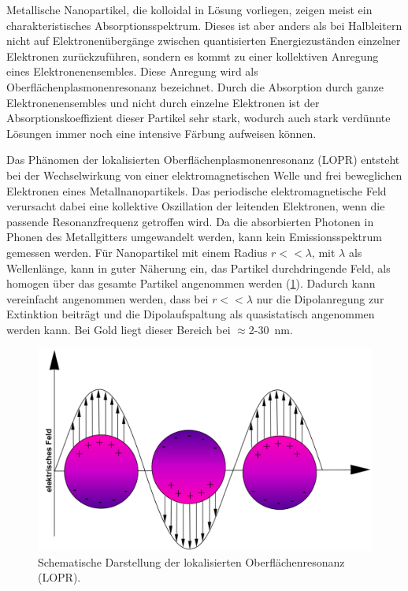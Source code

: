     Metallische Nanopartikel, die kolloidal in Lösung vorliegen, zeigen meist ein charakteristisches Absorptionsspektrum.
    Dieses ist aber anders als bei Halbleitern nicht auf Elektronenübergänge zwischen quantisierten Energiezuständen einzelner Elektronen zurückzuführen, sondern es kommt zu einer kollektiven Anregung eines Elektronenensembles.
    Diese Anregung wird als Oberflächenplasmonenresonanz bezeichnet. \autocite{Mulvaney1996}
    Durch die Absorption durch ganze Elektronenensembles und nicht durch einzelne Elektronen ist der Absorptionskoeffizient dieser Partikel sehr stark, wodurch auch stark verdünnte Lösungen immer noch eine intensive Färbung aufweisen können. 
    
    Das Phänomen der lokalisierten Oberflächenplasmonenresonanz (LOPR) entsteht bei der Wechselwirkung von einer elektromagnetischen Welle und frei beweglichen Elektronen eines Metallnanopartikels.\autocite{Hu2006}
    Das periodische elektromagnetische Feld verursacht dabei eine kollektive Oszillation der leitenden Elektronen, wenn die passende Resonanzfrequenz getroffen wird.
    Da die absorbierten Photonen in Phonen des Metallgitters umgewandelt werden, kann kein Emissionsspektrum gemessen werden.
    Für Nanopartikel mit einem Radius $r<<\lambda$, mit $\lambda$ als Wellenlänge, kann in guter Näherung ein, das Partikel durchdringende Feld, als homogen über das gesamte Partikel angenommen werden (\cref{fig:LOPR}). \autocite{Xu1999}
    Dadurch kann vereinfacht angenommen werden, dass bei $r<<\lambda$ nur die Dipolanregung zur Extinktion beiträgt und die Dipolaufspaltung als quasistatisch angenommen werden kann. 
    Bei Gold liegt dieser Bereich bei $\approx$2-30~nm.
    
    \begin{figure}[H]
        \centering
        \includegraphics[width=0.6\linewidth]{Bilder/LSPR}
        \caption{Schematische Darstellung der lokalisierten Oberflächenresonanz (LOPR).}
        \label{fig:LOPR}
    \end{figure}
    
